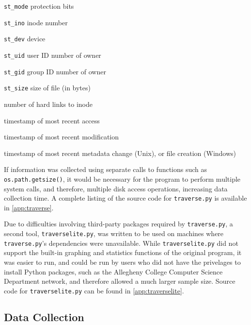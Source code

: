 \documentclass[12pt,letterpaper]{article}
\begin{document}
			\begin{description}[leftmargin=3cm, style=sameline]
				\begin{multicols}{2}
					\item[\texttt{st\_mode}]{protection bits}
					\item[\texttt{st\_ino}]{inode number}
					\item[\texttt{st\_dev}]{device}
					\item[\texttt{st\_uid}]{user ID number of owner}
					\item[\texttt{st\_gid}]{group ID number of owner}
					\item[\texttt{st\_size}]{size of file (in bytes)}
				\end{multicols}
				\item[\texttt{st\_nlink}]{number of hard links to inode}
				\item[\texttt{st\_atime}]{timestamp of most recent access}
				\item[\texttt{st\_mtime}]{timestamp of most recent modification}
				\item[\texttt{st\_ctime}]{timestamp of most recent metadata change (Unix), or file creation \allowbreak(Windows)}
			\end{description}

			If information was collected using separate calls to functions such as \\\texttt{os.path.getsize()}, it would be necessary for the program to perform multiple system calls, and therefore, multiple disk access operations, increasing data collection time. 
			A complete listing of the source code for \texttt{traverse.py} is available in \cref{app:traverse}.

			Due to difficulties involving third-party packages required by \texttt{traverse.py}, a second tool, \texttt{traverselite.py}, was written to be used on machines where \texttt{traverse.py}'s dependencies were unavailable. While \texttt{traverselite.py} did not support the built-in graphing and statistics functions of the original program, it was easier to run, and could be run by users who did not have the privelages to install Python packages, such as the Allegheny College Computer Science Department network, and therefore allowed a much larger sample size. Source code for \texttt{traverselite.py} can be found in \cref{app:traverselite}.

		\subsection{Data Collection}
\end{document}
